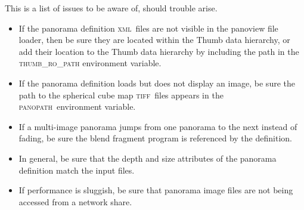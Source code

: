 \documentclass[oneside,11pt]{memoir}
\newcommand{\tiff}    {\textsc{tiff}}
\newcommand{\xml}     {\textsc{xml}}
\newcommand{\panopath}{\textsc{panopath}}
\begin{document}
\begin{Spacing}{1.1}
This is a list of issues to be aware of, should trouble arise.

\begin{itemize}
\item If the panorama definition \xml\ files are not visible in the panoview file loader, then be sure they are located within the Thumb data hierarchy, or add their location to the Thumb data hierarchy by including the path in the \textsc{thumb\_ro\_path} environment variable.

\item If the panorama definition loads but does not display an image, be sure the path to the spherical cube map \tiff\ files appears in the \panopath\ environment variable.

\item If a multi-image panorama jumps from one panorama to the next instead of fading, be sure the blend fragment program is referenced by the definition.

\item In general, be sure that the depth and size attributes of the panorama definition match the input files.

\item If performance is sluggish, be sure that panorama image files are not being accessed from a network share.
\end{itemize}

\printpagenotes
\end{Spacing}
\end{document}
